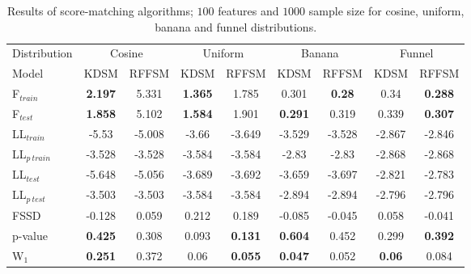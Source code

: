 \begin{table}[!h]
    \centering
\caption{Results of score-matching algorithms; $100$ features and $1000$ sample size for cosine, uniform, banana and funnel distributions.}
    \label{tab:tab:2d_1000_100_1}
    \begin{tabular}{lcccccccc}
\toprule
Distribution &  \multicolumn{2}{c}{Cosine} & \multicolumn{2}{c}{Uniform} & \multicolumn{2}{c}{Banana}& \multicolumn{2}{c}{Funnel}\\
Model        &  KDSM &  RFFSM &  KDSM &  RFFSM &  KDSM &  RFFSM &  KDSM &  RFFSM \\
\midrule
F$_{train}$&           \textbf{2.197} &      5.331 &           \textbf{1.365} &      1.785 &           0.301 &       \textbf{0.28} &            0.34 &      \textbf{0.288} \\
F$_{test}$  &           \textbf{1.858} &      5.102 &           \textbf{1.584} &      1.901 &           \textbf{0.291} &      0.319 &           0.339 &      \textbf{0.307} \\
LL$_{train}$        &           -5.53 &     -5.008 &           -3.66 &     -3.649 &          -3.529 &     -3.528 &          -2.867 &     -2.846 \\
LL$_{p~train}$    &          -3.528 &     -3.528 &          -3.584 &     -3.584 &           -2.83 &      -2.83 &          -2.868 &     -2.868 \\
LL$_{test}$        &          -5.648 &     -5.056 &          -3.689 &     -3.692 &          -3.659 &     -3.697 &          -2.821 &     -2.783 \\
LL$_{p~test}$     &          -3.503 &     -3.503 &          -3.584 &     -3.584 &          -2.894 &     -2.894 &          -2.796 &     -2.796 \\
FSSD             &          -0.128 &      0.059 &           0.212 &      0.189 &          -0.085 &     -0.045 &           0.058 &     -0.041 \\
p-value          &           \textbf{0.425} &      0.308 &           0.093 &      \textbf{0.131} &           \textbf{0.604} &      0.452 &           0.299 &      \textbf{0.392} \\
W$_1$               &        \textbf{0.251} &   0.372 &       0.06 &  \textbf{0.055} &       \textbf{0.047} &  0.052 &       \textbf{0.06} &  0.084 \\
\bottomrule
\end{tabular}
\end{table}

